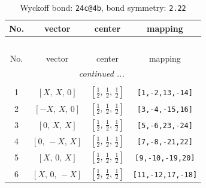 \documentclass[fleqn,8pt]{jsarticle}
\begin{document}
\begin{longtable}{cccc}
\caption{Wyckoff bond: {\tt 24c@4b}, bond symmetry: {\tt 2.22}}
 \\
 \hline \hline
No. & vector & center & mapping \\ \hline \endfirsthead

\multicolumn{3}{l}{\tablename\ \thetable{}} \\
 \hline \hline
No. & vector & center & mapping \\ \hline \endhead

 \hline \hline
\multicolumn{3}{r}{\footnotesize\it continued ...} \\ \endfoot

 \hline \hline
\multicolumn{3}{r}{} \\ \endlastfoot

1 & $\left[ X,\, X,\, 0 \right]$ & $\left[ \frac{1}{2},\, \frac{1}{2},\, \frac{1}{2} \right]$ & {\tt [1,-2,13,-14]} \\ \hline
2 & $\left[ - X,\, X,\, 0 \right]$ & $\left[ \frac{1}{2},\, \frac{1}{2},\, \frac{1}{2} \right]$ & {\tt [3,-4,-15,16]} \\ \hline
3 & $\left[ 0,\, X,\, X \right]$ & $\left[ \frac{1}{2},\, \frac{1}{2},\, \frac{1}{2} \right]$ & {\tt [5,-6,23,-24]} \\ \hline
4 & $\left[ 0,\, - X,\, X \right]$ & $\left[ \frac{1}{2},\, \frac{1}{2},\, \frac{1}{2} \right]$ & {\tt [7,-8,-21,22]} \\ \hline
5 & $\left[ X,\, 0,\, X \right]$ & $\left[ \frac{1}{2},\, \frac{1}{2},\, \frac{1}{2} \right]$ & {\tt [9,-10,-19,20]} \\ \hline
6 & $\left[ X,\, 0,\, - X \right]$ & $\left[ \frac{1}{2},\, \frac{1}{2},\, \frac{1}{2} \right]$ & {\tt [11,-12,17,-18]} \\
\end{longtable}
\renewcommand{\arraystretch}{1.2}
\end{document}
